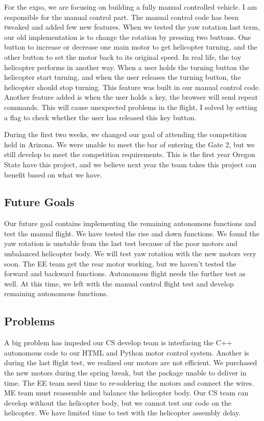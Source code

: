 \documentclass[onecolumn, draftclsnofoot,10pt, compsoc]{IEEEtran}
\begin{document}
For the expo, we are focusing on building a fully manual controlled vehicle. I am responsible for the manual control part. The manual control code has been tweaked and added few new features. When we tested the yaw rotation last term, our old implementation is to change the rotation by pressing two buttons. One button to increase or decrease one main motor to get helicopter turning, and the other button to set the motor back to its original speed. In real life, the toy helicopter performs in another way. When a user holds the turning button the helicopter start turning, and when the user releases the turning button, the helicopter should stop turning. This feature was built in our manual control code. Another feature added is when the user holds a key, the browser will send repeat commands. This will cause unexpected problems in the flight, I solved by setting a flag to check whether the user has released this key button.

During the first two weeks, we changed our goal of attending the competition held in Arizona. We were unable to meet the bar of entering the Gate 2, but we still develop to meet the competition requirements. This is the first year Oregon State have this project, and we believe next year the team takes this project can benefit based on what we have.

\subsection{Future Goals}

Our future goal contains implementing the remaining autonomous functions and test the manual flight. We have tested the rise and down functions. We found the yaw rotation is unstable from the last test because of the poor motors and unbalanced helicopter body. We will test yaw rotation with the new motors very soon. The EE team get the rear motor working, but we haven’t tested the forward and backward functions. Autonomous flight needs the further test as well. At this time, we left with the manual control flight test and develop remaining autonomous functions.

\subsection{Problems}

A big problem has impeded our CS develop team is interfacing the C++ autonomous code to our HTML and Python motor control system. Another is during the last flight test, we realized our motors are not efficient. We purchased the new motors during the spring break, but the package unable to deliver in time. The EE team need time to re-soldering the motors and connect the wires. ME team must reassemble and balance the helicopter body. Our CS team can develop without the helicopter body, but we cannot test our code on the helicopter. We have limited time to test with the helicopter assembly delay.
\end{document}
